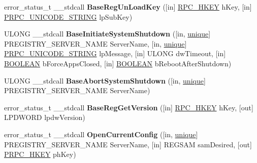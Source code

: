 \begin{DoxyCompactItemize}
error\+\_\+status\+\_\+t \+\_\+\+\_\+stdcall {\bfseries Base\+Reg\+Un\+Load\+Key} (\mbox{[}in\mbox{]} \hyperlink{interfacevoid}{R\+P\+C\+\_\+\+H\+K\+EY} h\+Key, \mbox{[}in\mbox{]} \hyperlink{struct___r_p_c___u_n_i_c_o_d_e___s_t_r_i_n_g}{P\+R\+P\+C\+\_\+\+U\+N\+I\+C\+O\+D\+E\+\_\+\+S\+T\+R\+I\+NG} lp\+Sub\+Key)
\item 
\mbox{\label{interfacewinreg_a3d5411a4f0a736839f25af6bacf757da}} 
U\+L\+O\+NG \+\_\+\+\_\+stdcall {\bfseries Base\+Initiate\+System\+Shutdown} (\mbox{[}in, \hyperlink{interfaceunique}{unique}\mbox{]} P\+R\+E\+G\+I\+S\+T\+R\+Y\+\_\+\+S\+E\+R\+V\+E\+R\+\_\+\+N\+A\+ME Server\+Name, \mbox{[}in, \hyperlink{interfaceunique}{unique}\mbox{]} \hyperlink{struct___r_p_c___u_n_i_c_o_d_e___s_t_r_i_n_g}{P\+R\+P\+C\+\_\+\+U\+N\+I\+C\+O\+D\+E\+\_\+\+S\+T\+R\+I\+NG} lp\+Message, \mbox{[}in\mbox{]} U\+L\+O\+NG dw\+Timeout, \mbox{[}in\mbox{]} \hyperlink{_processor_bind_8h_a112e3146cb38b6ee95e64d85842e380a}{B\+O\+O\+L\+E\+AN} b\+Force\+Apps\+Closed, \mbox{[}in\mbox{]} \hyperlink{_processor_bind_8h_a112e3146cb38b6ee95e64d85842e380a}{B\+O\+O\+L\+E\+AN} b\+Reboot\+After\+Shutdown)
\item 
\mbox{\label{interfacewinreg_a4ae029c44d3bcabd6f39d15a8af2dd87}} 
U\+L\+O\+NG \+\_\+\+\_\+stdcall {\bfseries Base\+Abort\+System\+Shutdown} (\mbox{[}in, \hyperlink{interfaceunique}{unique}\mbox{]} P\+R\+E\+G\+I\+S\+T\+R\+Y\+\_\+\+S\+E\+R\+V\+E\+R\+\_\+\+N\+A\+ME Server\+Name)
\item 
\mbox{\label{interfacewinreg_a2090a03f1a059950bc46211e5f2af93a}} 
error\+\_\+status\+\_\+t \+\_\+\+\_\+stdcall {\bfseries Base\+Reg\+Get\+Version} (\mbox{[}in\mbox{]} \hyperlink{interfacevoid}{R\+P\+C\+\_\+\+H\+K\+EY} h\+Key, \mbox{[}out\mbox{]} L\+P\+D\+W\+O\+RD lpdw\+Version)
\item 
\mbox{\label{interfacewinreg_a5304f2889ce8d1e337c327bbaba56d00}} 
error\+\_\+status\+\_\+t \+\_\+\+\_\+stdcall {\bfseries Open\+Current\+Config} (\mbox{[}in, \hyperlink{interfaceunique}{unique}\mbox{]} P\+R\+E\+G\+I\+S\+T\+R\+Y\+\_\+\+S\+E\+R\+V\+E\+R\+\_\+\+N\+A\+ME Server\+Name, \mbox{[}in\mbox{]} R\+E\+G\+S\+AM sam\+Desired, \mbox{[}out\mbox{]} \hyperlink{interfacevoid}{P\+R\+P\+C\+\_\+\+H\+K\+EY} ph\+Key)
\item 
\mbox{\label{interfacewinreg_aa68270389a0a27bf208e93377005c728}} 

\end{DoxyCompactItemize}
